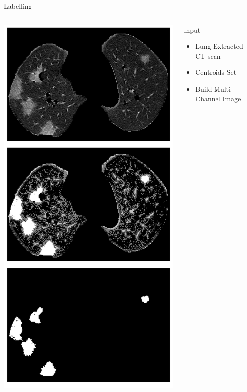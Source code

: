 \documentclass{standalone}
\begin{document}
	\begin{frame}{Labelling}
		\begin{columns}
			\begin{column}{.4\textwidth}
				\centering\includegraphics[width=.7\linewidth]{./img/labelling.png}
			\end{column}
		
			\begin{column}{.4\textwidth}
				
				\begin{block}{Input}
					\begin{itemize}
						\item Lung Extracted CT scan
						
						\item Centroids Set
					\end{itemize}
				\end{block}
				\begin{block}{}
					\begin{itemize}
						\item Build Multi Channel Image	
						

\end{itemize}
\end{block}
\end{column}
\end{columns}
\end{frame}
\end{document}
